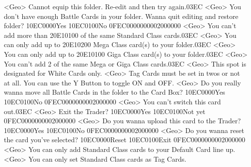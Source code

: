 <Geo> Cannot equip this folder. Re-edit and then try again.{03}{EC}
<Geo> You don't have enough Battle Cards in your folder. 
Wanna quit editing and restore folder? {10}{EC}{00}{00}Yes {10}{EC}{01}{00}No {0F}{EC}{00}{00}{00}{00}{02}{00}{00}{00}
<Geo> You can't add more than {20}{E1}{01}{00} of the same Standard Class cards.{03}{EC}
<Geo> You can only add up to {20}{E1}{02}{00} Mega Class card(s) to your folder.{03}{EC}
<Geo> You can only add up to {20}{E1}{01}{00} Giga Class card(s) to your folder.{03}{EC}
<Geo> You can't add 2 of the same Mega or Giga Class cards.{03}{EC}
<Geo> This spot is designated for White Cards only. 
<Geo> Tag Cards must be set in twos or not at all. 
You can use the Y Button to toggle ON and OFF. 
<Geo> Do you really wanna move all Battle Cards in the folder to the Card Box? {10}{EC}{00}{00}Yes {10}{EC}{01}{00}No {0F}{EC}{00}{00}{00}{00}{02}{00}{00}{00}
<Geo> You can't switch this card out.{03}{EC}
<Geo> Exit the Trader? {10}{EC}{00}{00}Yes {10}{EC}{01}{00}Not yet {0F}{EC}{00}{00}{00}{00}{02}{00}{00}{00}
<Geo> Do you wanna upload this card to the Trader? {10}{EC}{00}{00}Yes {10}{EC}{01}{00}No {0F}{EC}{00}{00}{00}{00}{02}{00}{00}{00}
<Geo> Do you wanna reset the card you've selected? {10}{EC}{00}{00}Reset {10}{EC}{01}{00}Exit {0F}{EC}{00}{00}{00}{00}{02}{00}{00}{00}
<Geo> You can only add Standard Class cards to your Default Card line up. 
<Geo> You can only set Standard Class cards as Tag Cards. 
